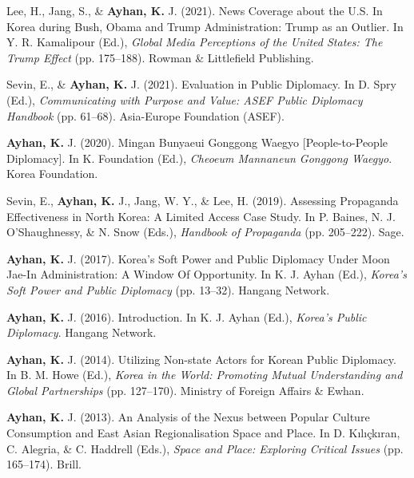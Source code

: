 \documentclass[11pt,a4paper,]{awesome-cv}
\begin{document}
\leavevmode{}%
Lee, H., Jang, S., \& \textbf{Ayhan, K.} J. (2021). News {Coverage}
about the {U}.{S}. In {Korea} during {Bush}, {Obama} and {Trump}
{Administration}: {Trump} as an {Outlier}. In Y. R. Kamalipour (Ed.),
\emph{Global {Media} {Perceptions} of the {United} {States}: {The}
{Trump} {Effect}} (pp. 175--188). Rowman \& Littlefield Publishing.

\leavevmode{}%
Sevin, E., \& \textbf{Ayhan, K.} J. (2021). Evaluation in {Public}
{Diplomacy}. In D. Spry (Ed.), \emph{Communicating with {Purpose} and
{Value}: {ASEF} {Public} {Diplomacy} {Handbook}} (pp. 61--68).
Asia-Europe Foundation (ASEF).

\leavevmode{}%
\textbf{Ayhan, K.} J. (2020). Mingan {Bunyaeui} {Gonggong} {Waegyo}
{[}{People}-to-{People} {Diplomacy}{]}. In K. Foundation (Ed.),
\emph{Cheoeum {Mannaneun} {Gonggong} {Waegyo}}. Korea Foundation.

\leavevmode{}%
Sevin, E., \textbf{Ayhan, K.} J., Jang, W. Y., \& Lee, H. (2019).
Assessing {Propaganda} {Effectiveness} in {North} {Korea}: {A} {Limited}
{Access} {Case} {Study}. In P. Baines, N. J. O'Shaughnessy, \& N. Snow
(Eds.), \emph{Handbook of {Propaganda}} (pp. 205--222). Sage.

\leavevmode{}%
\textbf{Ayhan, K.} J. (2017). Korea's {Soft} {Power} and {Public}
{Diplomacy} {Under} {Moon} {Jae}-{In} {Administration}: {A} {Window}
{Of} {Opportunity}. In K. J. Ayhan (Ed.), \emph{Korea's {Soft} {Power}
and {Public} {Diplomacy}} (pp. 13--32). Hangang Network.

\leavevmode{}%
\textbf{Ayhan, K.} J. (2016). Introduction. In K. J. Ayhan (Ed.),
\emph{Korea's {Public} {Diplomacy}}. Hangang Network.

\leavevmode{}%
\textbf{Ayhan, K.} J. (2014). Utilizing {Non}-state {Actors} for
{Korean} {Public} {Diplomacy}. In B. M. Howe (Ed.), \emph{Korea in the
{World}: {Promoting} {Mutual} {Understanding} and {Global}
{Partnerships}} (pp. 127--170). Ministry of Foreign Affairs \& Ewhan.

\leavevmode{}%
\textbf{Ayhan, K.} J. (2013). An {Analysis} of the {Nexus} between
{Popular} {Culture} {Consumption} and {East} {Asian} {Regionalisation}
{Space} and {Place}. In D. Kılıçkıran, C. Alegria, \& C. Haddrell
(Eds.), \emph{Space and {Place}: {Exploring} {Critical} {Issues}} (pp.
165--174). Brill.
\end{document}
